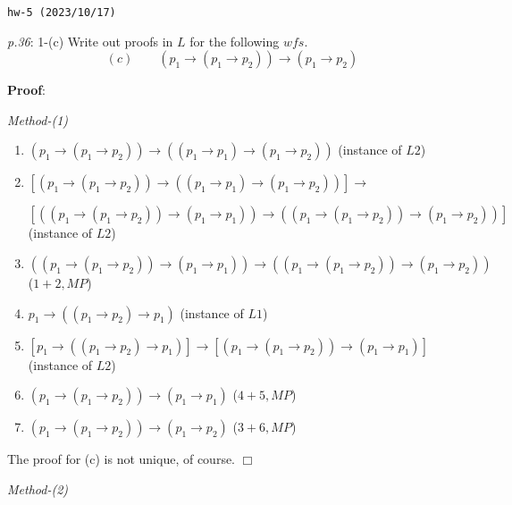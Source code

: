 \documentclass[UTF8,12pt,a4paper]{ctexart}
\begin{document}
\noindent\texttt{hw-5 (2023/10/17)}

\emph{p.36}: 1-(c) \quad
Write out proofs in $L$ for the following $wfs$.
\[
(c) \qquad  (p_1 \to (p_1 \to p_2)) \to (p_1 \to p_2)
\] 

\noindent\textbf{Proof}: 

\noindent\textit{Method-(1)}

\begin{enumerate}
	\item $ (p_1 \to (p_1 \to p_2)) \to ((p_1 \to p_1) \to (p_1 \to p_2)) $
	\hfill (instance of $L2$)
	
	\item $ [(p_1 \to (p_1 \to p_2)) \to ((p_1 \to p_1) \to (p_1 \to p_2))] \to  $
	
	$
	[( (p_1 \to (p_1 \to p_2)) \to (p_1 \to p_1))  \to
	( (p_1 \to (p_1 \to p_2)) \to (p_1 \to p_2)) ]
	$
	\hfill (instance of $L2$)
	
	\item $ ( (p_1 \to (p_1 \to p_2)) \to (p_1 \to p_1))  \to
	( (p_1 \to (p_1 \to p_2)) \to (p_1 \to p_2))$
	\hfill ($1+2,MP$)
	
	\item $p_1 \to ((p_1 \to p_2) \to p_1)$ 
	\hfill (instance of $L1$)
	
	\item $[p_1 \to ((p_1 \to p_2) \to p_1)] \to 
	[ (p_1 \to (p_1 \to p_2))  \to (p_1 \to p_1) ]$ 
	\hfill (instance of $L2$)
	
	\item $(p_1 \to (p_1 \to p_2))  \to (p_1 \to p_1)$
	\hfill ($4+5, MP$)
	
	\item $(p_1 \to (p_1 \to p_2)) \to (p_1 \to p_2)$ 
	\hfill ($3+6, MP$)
\end{enumerate}
The proof for (c) is not unique, of course.
\hfill $\Box$


\vspace{1em} 

\noindent\textit{Method-(2)}
\end{document}

